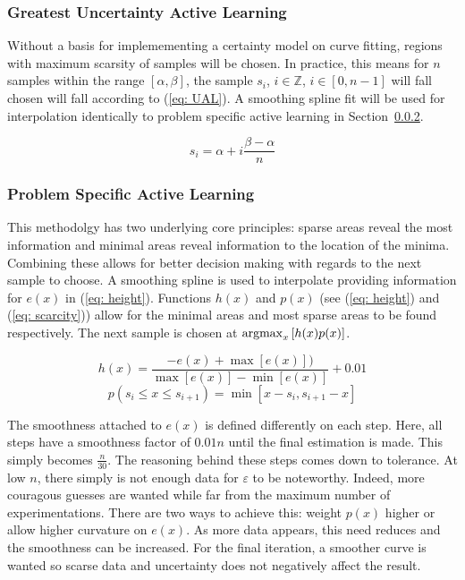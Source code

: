 \subsubsection{Greatest Uncertainty Active Learning}
Without a basis for implemementing a certainty model on curve fitting, regions with maximum scarsity of samples will be chosen. In practice, this means for $n$ samples within the range $[\alpha, \beta]$, the sample $s_i$, $i\in\mathbb{Z}$, $i\in[0, n-1]$ will fall chosen will fall according to (\ref{eq: UAL}). A smoothing spline fit will be used for interpolation identically to problem specific active learning in Section~\ref{sssec:Active Learning}.

\begin{equation}
  \label{eq: UAL}
  s_i=\alpha+i\frac{\beta-\alpha}{n}
\end{equation}

\subsubsection{Problem Specific Active Learning}
\label{sssec:Active Learning}
This methodolgy has two underlying core principles: sparse areas reveal the most information and minimal areas reveal information to the location of the minima. Combining these allows for better decision making with regards to the next sample to choose. A smoothing spline is used to interpolate providing information for $e(x)$ in (\ref{eq: height}). Functions $h(x)$ and $p(x)$ (see (\ref{eq: height}) and (\ref{eq: scarcity})) allow for the minimal areas and most sparse areas to be found respectively. The next sample is chosen at ${\operatorname*{argmax}_x{[h(x)p(x)]}}$.

\begin{equation}
  \label{eq: height}
  {h(x)=\frac{-e(x)+\max[e(x)])}{\max[e(x)]-\min[e(x)]}}+0.01
\end{equation}
\begin{equation}
  \label{eq: scarcity}
  p(s_i \le x \le s_{i+1})=\min[x-s_i, s_{i+1}-x]
\end{equation}

The smoothness attached to $e(x)$ is defined differently on each step. Here, all steps have a smoothness factor of $0.01n$ until the final estimation is made. This simply becomes $\frac{n}{30}$. The reasoning behind these steps comes down to tolerance. At low $n$, there simply is not enough data for $\varepsilon$ to be noteworthy. Indeed, more couragous guesses are wanted while far from the maximum number of experimentations. There are two ways to achieve this: weight $p(x)$ higher or allow higher curvature on $e(x)$. As more data appears, this need reduces and the smoothness can be increased. For the final iteration, a smoother curve is wanted so scarse data and uncertainty does not negatively affect the result.

